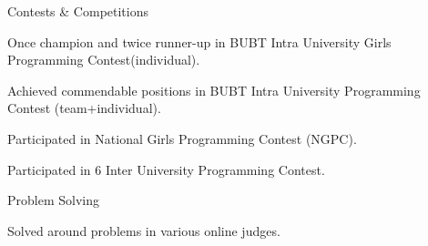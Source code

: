 

\begin{cventries}

  \cventry
    {} %
    {Contests \& Competitions} %
    {} %
    {} %
    {
      \begin{cvitems} %
        \item {Once champion and twice runner-up in BUBT Intra University Girls Programming Contest(individual).}
        \item {Achieved commendable positions in BUBT Intra University Programming Contest (team+individual).}
        \item {Participated in National Girls Programming Contest (NGPC).}
        \item {Participated in 6 Inter University Programming Contest.}
      \end{cvitems}
    }

  \cventry
    {} %
    {Problem Solving} %
    {} %
    {} %
    {
      \begin{cvitems} %
        \item {
        Solved around {} 
        problems in various online judges.}
      \end{cvitems}
    }

\end{cventries}

